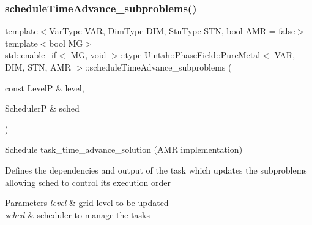\subsubsection{\texorpdfstring{schedule\+Time\+Advance\+\_\+subproblems()}{scheduleTimeAdvance\_subproblems()}\hspace{0.1cm}{\footnotesize\ttfamily [2/2]}}
{\footnotesize\ttfamily template$<$Var\+Type V\+AR, Dim\+Type D\+IM, Stn\+Type S\+TN, bool A\+MR = false$>$ \\
template$<$bool MG$>$ \\
std\+::enable\+\_\+if$<$ MG, void $>$\+::type \hyperlink{classUintah_1_1PhaseField_1_1PureMetal}{Uintah\+::\+Phase\+Field\+::\+Pure\+Metal}$<$ V\+AR, D\+IM, S\+TN, A\+MR $>$\+::schedule\+Time\+Advance\+\_\+subproblems (\begin{DoxyParamCaption}\item[{const LevelP \&}]{level,  }\item[{SchedulerP \&}]{sched }\end{DoxyParamCaption})\hspace{0.3cm}{\ttfamily [protected]}}



Schedule task\+\_\+time\+\_\+advance\+\_\+solution (A\+MR implementation) 

Defines the dependencies and output of the task which updates the subproblems allowing sched to control its execution order


\begin{DoxyParams}{Parameters}
{\em level} & grid level to be updated \\
\hline
{\em sched} & scheduler to manage the tasks \\
\hline
\end{DoxyParams}
\mbox{\label{classUintah_1_1PhaseField_1_1PureMetal_ad93d54a2b16de3f0a6411e96a3f6ca6a}} 

